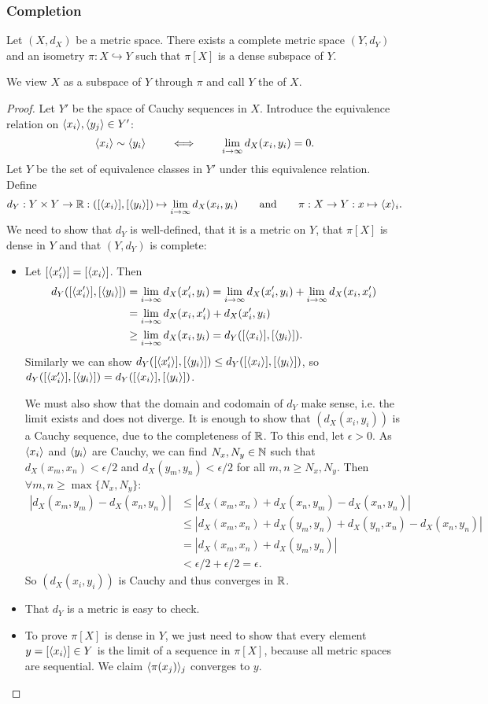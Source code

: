 \subsubsection{Completion}
\begin{proposition}
Let $(X,d_X)$ be a metric space. There exists a complete metric space $(Y,d_Y)$ and an isometry $\pi:X\hookrightarrow Y$ such that $\pi[X]$ is a dense subspace of $Y$.
\end{proposition}
We view $X$ as a subspace of $Y$ through $\pi$ and call $Y$ the  of $X$.
\begin{proof}
Let $Y'$ be the space of Cauchy sequences in $X$. Introduce the equivalence relation on $\langle x_i \rangle,\langle y_j \rangle\in Y'$:
\[ \langle x_i \rangle \sim \langle y_i \rangle \qquad \iff\qquad \lim_{i\to\infty} d_X(x_i,y_i) = 0. \]
Let $Y$ be the set of equivalence classes in $Y'$ under this equivalence relation. Define
\[ d_Y: Y\times Y\to \mathbb{R}: ([\langle x_i \rangle],[\langle y_i \rangle]) \mapsto \lim_{i\to\infty}d_X(x_i,y_i) \qquad\text{and}\qquad \pi: X\to Y: x\mapsto \langle x \rangle_i. \]
We need to show that $d_Y$ is well-defined, that it is a metric on $Y$, that $\pi[X]$ is dense in $Y$ and that $(Y,d_Y)$ is complete:
\begin{itemize}
\item Let $[\langle x_i' \rangle] = [\langle x_i \rangle]$. Then
\begin{align*}
d_Y([\langle x_i' \rangle],[\langle y_i \rangle]) &= \lim_{i\to\infty}d_X(x'_i,y_i) = \lim_{i\to\infty}d_X(x'_i,y_i) + \lim_{i\to\infty}d_X(x_i,x'_i) \\
&= \lim_{i\to\infty}d_X(x_i,x_i')+d_X(x'_i,y_i) \\
&\geq \lim_{i\to\infty}d_X(x_i,y_i) = d_Y([\langle x_i \rangle],[\langle y_i \rangle]).
\end{align*}
Similarly we can show $d_Y([\langle x_i' \rangle],[\langle y_i \rangle])\leq d_Y([\langle x_i \rangle],[\langle y_i \rangle])$, so $d_Y([\langle x'_i \rangle],[\langle y_i \rangle]) = d_Y([\langle x_i \rangle],[\langle y_i \rangle])$.

We must also show that the domain and codomain of $d_Y$ make sense, i.e. the limit exists and does not diverge. It is enough to show that $(d_X(x_i,y_i))$ is a Cauchy sequence, due to the completeness of $\mathbb{R}$. To this end, let $\epsilon>0$. As $\langle x_i \rangle$ and $\langle y_i \rangle$ are Cauchy, we can find $N_x,N_y\in\mathbb{N}$ such that $d_X(x_m,x_n)< \epsilon/2$ and $d_X(y_m,y_n) < \epsilon/2$ for all $m,n \geq N_x,N_y$. Then $\forall m,n \geq \max\{N_x,N_y\}$:
\begin{align*}
|d_X(x_m,y_m) - d_X(x_n,y_n)| &\leq |d_X(x_m,x_n)+d_X(x_n,y_m) - d_X(x_n,y_n)| \\
&\leq |d_X(x_m,x_n)+d_X(y_m,y_n)+ d_X(y_n,x_n) - d_X(x_n,y_n)| \\
&= |d_X(x_m,x_n)+d_X(y_m,y_n)| \\
&< \epsilon/2 + \epsilon/2= \epsilon.
\end{align*}
So $(d_X(x_i,y_i))$ is Cauchy and thus converges in $\mathbb{R}$.
\item That $d_Y$ is a metric is easy to check.
\item To prove $\pi[X]$ is dense in $Y$, we just need to show that every element $y = [\langle x_i \rangle]\in Y$ is the limit of a sequence in $\pi[X]$, because all metric spaces are sequential. We claim $\langle \pi(x_j) \rangle_j$ converges to $y$.


\end{itemize}
\end{proof}

